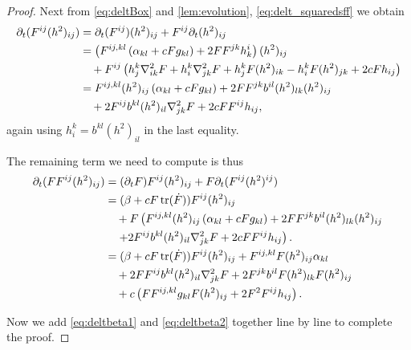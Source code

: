 \documentclass{amsart}
\begin{document}
\begin{proof}
Next from \eqref{eq:deltBox} and \cref{lem:evolution}, \cref{eq:delt_squaredsff} we obtain
\[
\begin{split}
\partial_{t} (F^{ij}(h^2)_{ij}) &= \partial_{t}(F^{ij}) (h^2)_{ij} + F^{ij} \partial_t (h^2)_{ij} \\
&= \left(F^{ij,kl} \left(\alpha_{kl} + c F g_{kl}\right) + 2FF^{jk}h^{i}_{k}\right) (h^2)_{ij} \\
&\quad + F^{ij} \left(h^k_j \nabla^2_{i
k} F + h^k_i \nabla^2_{jk} F + h^k_j F(h^2)_{ik} - h^k_i F(h^2)_{jk} + 2cF h_{ij}\right) \\
&= F^{ij,kl} (h^2)_{ij} \left(\alpha_{kl} + c F g_{kl}\right) + 2FF^{jk} b^{il} (h^2)_{lk} (h^2)_{ij} \\
&\quad + 2 F^{ij} b^{kl} (h^2)_{il} \nabla^2_{jk} F  + 2cFF^{ij}h_{ij},
\end{split}
\]
again using \(h^k_i = b^{kl} (h^2)_{il}\) in the last equality.

The remaining term we need to compute is thus
\begin{equation}
\label{eq:deltbeta2}
\begin{split}
\partial_{t} (F F^{ij}(h^2)_{ij}) &= (\partial_{t} F) F^{ij}(h^2)_{ij} + F \partial_t (F^{ij} (h^2)^{ij}) \\
&= (\beta + c F\operatorname{tr}(\dot{F})) F^{ij}(h^2)_{ij} \\
&\quad + F \left(F^{ij,kl} (h^2)_{ij} \left(\alpha_{kl} + c F g_{kl}\right) + 2FF^{jk} b^{il} (h^2)_{lk} (h^2)_{ij} \right.\\
&\quad \left. + 2 F^{ij} b^{kl} (h^2)_{il} \nabla^2_{jk} F  + 2cFF^{ij}h_{ij}\right). \\
&= (\beta + c F\operatorname{tr}(\dot{F})) F^{ij}(h^2)_{ij} + F^{ij,kl} F (h^2)_{ij} \alpha_{kl}  \\
&\quad + 2 FF^{ij} b^{kl} (h^2)_{il} \nabla^2_{jk} F + 2F^{jk} b^{il} F (h^2)_{lk} F (h^2)_{ij} \\
&\quad + c \left(F F^{ij,kl} g_{kl} F (h^2)_{ij} + 2F^2F^{ij}h_{ij}\right).
\end{split}
\end{equation}

Now we add \eqref{eq:deltbeta1} and \eqref{eq:deltbeta2} together line by line to complete the proof.
\end{proof}
\end{document}
